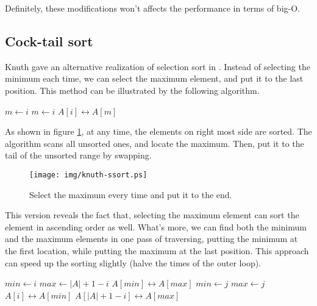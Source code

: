 \documentclass{article}
\begin{document}
Definitely, these modifications won't affects the performance in terms of big-O.

\subsection{Cock-tail sort}
Knuth gave an alternative realization of selection sort in \cite{TAOCP}. Instead of selecting the
minimum each time, we can select the maximum element, and put it to the last position. This method
can be illustrated by the following algorithm.

\begin{algorithmic}
    \State $m \gets i$
        \State $m \gets i$
      \EndIf
    \EndFor
    \State {} $A[i] \leftrightarrow A[m]$
  \EndFor
\EndProcedure
\end{algorithmic}

As shown in figure \ref{fig:knuth-ssort}, at any time, the elements on right most side
are sorted. The algorithm scans all unsorted ones, and locate the maximum. Then, put
it to the tail of the unsorted range by swapping.

\begin{figure}[htbp]
  \centering
  \texttt{[image: img/knuth-ssort.ps]}
  \caption{Select the maximum every time and put it to the end.}
  \label{fig:knuth-ssort}
\end{figure}

This version reveals the fact that, selecting the maximum element can sort the element in
ascending order as well. What's more, we can find both the minimum and the maximum elements
in one pass of traversing, putting the minimum at the first location, while putting the
maximum at the last position. This approach can speed up the sorting slightly (halve the
times of the outer loop).

\begin{algorithmic}
    \State $min \gets i$
    \State $max \gets |A| + 1 - i$
      \State {} $A[min] \leftrightarrow A[max]$
    \EndIf
        \State $min \gets j$
      \EndIf
        \State $max \gets j$
      \EndIf
    \EndFor
    \State {} $A[i] \leftrightarrow A[min]$
    \State {} $A[|A|+1-i] \leftrightarrow A[max]$
  \EndFor
\EndProcedure
\end{algorithmic}
\end{document}

